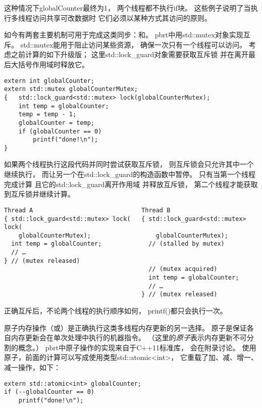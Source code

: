这种情况下{\ttfamily globalCounter}最终为1，
两个线程都不执行{\ttfamily if}块。
这些例子说明了当执行多线程访问共享可改数据时
它们必须以某种方式其访问的原则。

如今有两套主要机制可用于完成这类同步：和。
pbrt中用{\ttfamily std::mutex}对象实现互斥。
{\ttfamily std::mutex}能用于阻止访问某些资源，
确保一次只有一个线程可以访问。
考虑之前计算的如下升级版；
这里{\ttfamily std::lock\_guard}对象需要获取互斥锁
并在离开最后大括号作用域时释放它。
\begin{lstlisting}
extern int globalCounter;
extern std::mutex globalCounterMutex;
{   std::lock_guard<std::mutex> lock(globalCounterMutex);
    int temp = globalCounter;
    temp = temp - 1;
    globalCounter = temp;
    if (globalCounter == 0)
        printf("done!\n");
}
\end{lstlisting}
如果两个线程执行这段代码并同时尝试获取互斥锁，
则互斥锁会只允许其中一个继续执行，
而让另一个在{\ttfamily std::lock\_guard}的构造函数中暂停。
只有当第一个线程完成计算
且它的{\ttfamily std::lock\_guard}离开作用域
并释放互斥锁，
第二个线程才能获取到互斥锁并继续计算。
\begin{lstlisting}
Thread A                              Thread B
{ std::lock_guard<std::mutex> lock(   { std::lock_guard<std::mutex> lock(
    globalCounterMutex);                  globalCounterMutex);
  int temp = globalCounter;             // (stalled by mutex)
  // …
} // (mutex released)
                                        // (mutex acquired)
                                        int temp = globalCounter;
                                        // …
                                      } // (mutex released)
\end{lstlisting}

正确互斥后，不论两个线程的执行顺序如何，
{\ttfamily printf()}都只会执行一次。

原子内存操作（或）是正确执行这类多线程内存更新的另一选择。
原子是保证各自内存更新会在单次处理中执行的机器指令。
（这里的\emph{原子}表示内存更新不可分割的概念。）
pbrt中原子操作的实现来自于C++11标准库，
会在附录讨论。
使用原子，前面的计算可以写成使用类型{\ttfamily std::atomic<int>}，
它重载了加、减、增一、减一操作，如下：
\begin{lstlisting}
extern std::atomic<int> globalCounter;
if (--globalCounter == 0)
    printf("done!\n");
\end{lstlisting}

